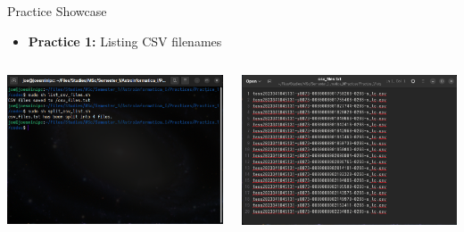 \documentclass[12pt, aspectratio=169]{beamer}
\begin{document}
  \begin{frame}[t]{Practice Showcase}
    \begin{itemize}
      \item \textbf{Practice 1:} Listing CSV filenames \vspace{2.5mm}
    \end{itemize}
    \begin{columns}
      \begin{column}{0.5\textwidth}
        \centering
        \includegraphics[width=\linewidth]{figures/1-1.png}
      \end{column}
      \begin{column}{0.5\textwidth}
        \centering
        \includegraphics[width=\linewidth]{figures/1-2.png}
      \end{column}
    \end{columns}
  \end{frame}
\end{document}
